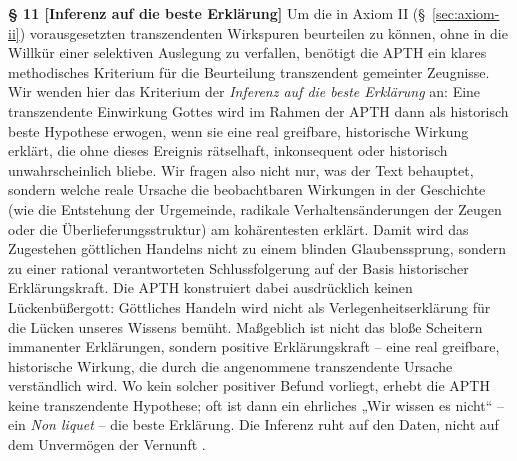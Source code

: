\documentclass[11pt,a4paper]{article}
\makeatletter
\newcommand{\apth}{{\apthfont APTH}\hspace{0.15em}\xspace}
\newcommand{\apthsec}[3]{%
  \phantomsection%
  \def\@currentlabel{#1}%
  \label{sec:#3}%
  \textbf{§ #1 [#2]}%
}
\makeatother
\begin{document}
\apthsec{11}{Inferenz auf die beste Erklärung}{inferenz} Um die in Axiom II (§~\ref{sec:axiom-ii}) vorausgesetzten transzendenten Wirkspuren beurteilen zu können, ohne in die Willkür einer selektiven Auslegung zu verfallen, benötigt die \apth ein klares methodisches Kriterium für die Beurteilung transzendent gemeinter Zeugnisse. Wir wenden hier das Kriterium der \textit{Inferenz auf die beste Erklärung} \citep{harman1965,lipton2004,wright1992} an: Eine transzendente Einwirkung Gottes wird im Rahmen der \apth dann als historisch beste Hypothese erwogen, wenn sie eine real greifbare, historische Wirkung erklärt, die ohne dieses Ereignis rätselhaft, inkonsequent oder historisch unwahrscheinlich bliebe. Wir fragen also nicht nur, was der Text behauptet, sondern welche reale Ursache die beobachtbaren Wirkungen in der Geschichte (wie die Entstehung der Urgemeinde, radikale Verhaltensänderungen der Zeugen oder die Überlieferungsstruktur) am kohärentesten erklärt. Damit wird das Zugestehen göttlichen Handelns nicht zu einem blinden Glaubenssprung, sondern zu einer rational verantworteten Schlussfolgerung auf der Basis historischer Erklärungskraft. Die \apth konstruiert dabei ausdrücklich keinen Lückenbüßergott: Göttliches Handeln wird nicht als Verlegenheitserklärung für die Lücken unseres Wissens bemüht. Maßgeblich ist nicht das bloße Scheitern immanenter Erklärungen, sondern positive Erklärungskraft – eine real greifbare, historische Wirkung, die durch die angenommene transzendente Ursache verständlich wird. Wo kein solcher positiver Befund vorliegt, erhebt die \apth keine transzendente Hypothese; oft ist dann ein ehrliches „Wir wissen es nicht“ – ein \textit{Non liquet} – die beste Erklärung. Die Inferenz ruht auf den Daten, nicht auf dem Unvermögen der Vernunft \citep{bonhoeffer1951,coulson1955,plantinga2011}.
\end{document}
